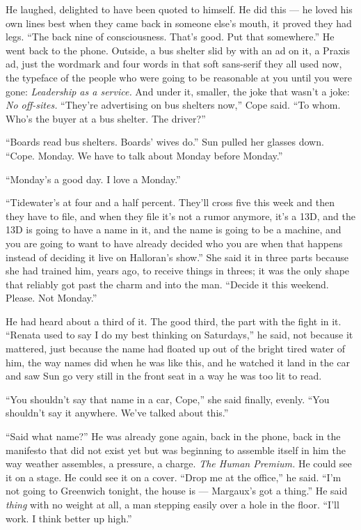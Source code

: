 \documentclass[11pt,openany]{book}
\begin{document}
He laughed, delighted to have been quoted to himself. He did this --- he loved his own lines best when they came back in someone else's mouth, it proved they had legs. ``The back nine of consciousness. That's good. Put that somewhere.'' He went back to the phone. Outside, a bus shelter slid by with an ad on it, a Praxis ad, just the wordmark and four words in that soft sans-serif they all used now, the typeface of the people who were going to be reasonable at you until you were gone: \textit{Leadership as a service.} And under it, smaller, the joke that wasn't a joke: \textit{No off-sites.} ``They're advertising on bus shelters now,'' Cope said. ``To whom. Who's the buyer at a bus shelter. The driver?''

``Boards read bus shelters. Boards' wives do.'' Sun pulled her glasses down. ``Cope. Monday. We have to talk about Monday before Monday.''

``Monday's a good day. I love a Monday.''

``Tidewater's at four and a half percent. They'll cross five this week and then they have to file, and when they file it's not a rumor anymore, it's a 13D, and the 13D is going to have a name in it, and the name is going to be a machine, and you are going to want to have already decided who you are when that happens instead of deciding it live on Halloran's show.'' She said it in three parts because she had trained him, years ago, to receive things in threes; it was the only shape that reliably got past the charm and into the man. ``Decide it this weekend. Please. Not Monday.''

He had heard about a third of it. The good third, the part with the fight in it. ``Renata used to say I do my best thinking on Saturdays,'' he said, not because it mattered, just because the name had floated up out of the bright tired water of him, the way names did when he was like this, and he watched it land in the car and saw Sun go very still in the front seat in a way he was too lit to read.

``You shouldn't say that name in a car, Cope,'' she said finally, evenly. ``You shouldn't say it anywhere. We've talked about this.''

``Said what name?'' He was already gone again, back in the phone, back in the manifesto that did not exist yet but was beginning to assemble itself in him the way weather assembles, a pressure, a charge. \textit{The Human Premium.} He could see it on a stage. He could see it on a cover. ``Drop me at the office,'' he said. ``I'm not going to Greenwich tonight, the house is --- Margaux's got a thing.'' He said \textit{thing} with no weight at all, a man stepping easily over a hole in the floor. ``I'll work. I think better up high.''
\end{document}
